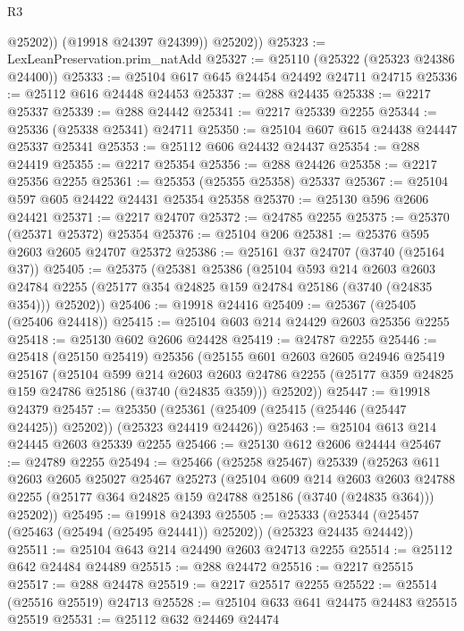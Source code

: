 \begin{lexlean}{R3}
\begin{coremodule}
              @25202))
          (@19918 @24397 @24399))
        @25202))
@25323 := LexLeanPreservation.prim_natAdd
@25327 := @25110 (@25322 (@25323 @24386 @24400))
@25333 := @25104 @617 @645 @24454 @24492 @24711 @24715
@25336 := @25112 @616 @24448 @24453
@25337 := @288 @24435
@25338 := @2217 @25337
@25339 := @288 @24442
@25341 := @2217 @25339 @2255
@25344 := @25336 (@25338 @25341) @24711
@25350 := @25104 @607 @615 @24438 @24447 @25337 @25341
@25353 := @25112 @606 @24432 @24437
@25354 := @288 @24419
@25355 := @2217 @25354
@25356 := @288 @24426
@25358 := @2217 @25356 @2255
@25361 := @25353 (@25355 @25358) @25337
@25367 := @25104 @597 @605 @24422 @24431 @25354 @25358
@25370 := @25130 @596 @2606 @24421
@25371 := @2217 @24707
@25372 := @24785 @2255
@25375 := @25370 (@25371 @25372) @25354
@25376 := @25104 @206
@25381 := @25376 @595 @2603 @2605 @24707 @25372
@25386 := @25161 @37 @24707 (@3740 (@25164 @37))
@25405 := @25375
    (@25381
      @25386
      (@25104
        @593
        @214
        @2603
        @2603
        @24784
        @2255
        (@25177 @354 @24825 @159 @24784 @25186 (@3740 (@24835 @354)))
        @25202))
@25406 := @19918 @24416
@25409 := @25367 (@25405 (@25406 @24418))
@25415 := @25104 @603 @214 @24429 @2603 @25356 @2255
@25418 := @25130 @602 @2606 @24428
@25419 := @24787 @2255
@25446 := @25418
    (@25150 @25419)
    @25356
    (@25155
      @601
      @2603
      @2605
      @24946
      @25419
      @25167
      (@25104
        @599
        @214
        @2603
        @2603
        @24786
        @2255
        (@25177 @359 @24825 @159 @24786 @25186 (@3740 (@24835 @359)))
        @25202))
@25447 := @19918 @24379
@25457 := @25350 (@25361 (@25409 (@25415 (@25446 (@25447 @24425)) @25202)) (@25323 @24419 @24426))
@25463 := @25104 @613 @214 @24445 @2603 @25339 @2255
@25466 := @25130 @612 @2606 @24444
@25467 := @24789 @2255
@25494 := @25466
    (@25258 @25467)
    @25339
    (@25263
      @611
      @2603
      @2605
      @25027
      @25467
      @25273
      (@25104
        @609
        @214
        @2603
        @2603
        @24788
        @2255
        (@25177 @364 @24825 @159 @24788 @25186 (@3740 (@24835 @364)))
        @25202))
@25495 := @19918 @24393
@25505 := @25333 (@25344 (@25457 (@25463 (@25494 (@25495 @24441)) @25202)) (@25323 @24435 @24442))
@25511 := @25104 @643 @214 @24490 @2603 @24713 @2255
@25514 := @25112 @642 @24484 @24489
@25515 := @288 @24472
@25516 := @2217 @25515
@25517 := @288 @24478
@25519 := @2217 @25517 @2255
@25522 := @25514 (@25516 @25519) @24713
@25528 := @25104 @633 @641 @24475 @24483 @25515 @25519
@25531 := @25112 @632 @24469 @24474

\end{coremodule}
\end{lexlean}
